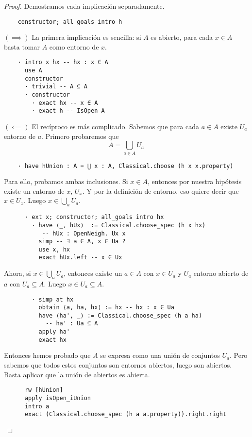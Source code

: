 \begin{proof}
  Demostramos cada implicación separadamente.

  \begin{lstlisting}
    constructor; all_goals intro h \end{lstlisting}

  $(\implies)$ La primera implicación es sencilla: si $A$ es abierto, para cada $x \in A$ basta tomar $A$ como entorno de $x$.

  \begin{lstlisting}
    · intro x hx -- hx : x ∈ A
      use A
      constructor
      · trivial -- A ⊆ A
      · constructor
        · exact hx -- x ∈ A
        · exact h -- IsOpen A \end{lstlisting}

  $(\impliedby)$ El recíproco es más complicado. Sabemos que para cada $a \in A$ existe $U_a$ entorno de $a$. Primero probaremos que
  $$
  A = \bigcup_{a \in A} U_a
  $$
  \begin{lstlisting}
    · have hUnion : A = ⋃ x : A, Classical.choose (h x x.property) \end{lstlisting}
  Para ello, probamos ambas inclusiones. Si $x \in A$, entonces por nuestra hipótesis existe un entorno de $x$, $U_x$. Y por la definición de entorno, eso quiere decir que $x \in U_x$. Luego $x \in \bigcup_{a}U_a$.

  \begin{lstlisting}
      · ext x; constructor; all_goals intro hx
        · have ⟨_, hUx⟩  := Classical.choose_spec (h x hx)
           -- hUx : OpenNeigh. Ux x
          simp -- ∃ a ∈ A, x ∈ Ua ?
          use x, hx
          exact hUx.left -- x ∈ Ux \end{lstlisting}

  Ahora, si $x \in \bigcup_{a}U_a$, entonces existe un $a \in A$ con $x \in U_a$ y $U_a$ entorno abierto de $a$ con $U_a \subseteq A$. Luego $x \in U_a \subseteq A$.

  \begin{lstlisting}
        · simp at hx
          obtain ⟨a, ha, hx⟩ := hx -- hx : x ∈ Ua
          have ⟨ha', _⟩ := Classical.choose_spec (h a ha)
            -- ha' : Ua ⊆ A
          apply ha'
          exact hx \end{lstlisting}
  
  Entonces hemos probado que $A$ se expresa como una unión de conjuntos $U_a$. Pero sabemos que todos estos conjuntos son entornos abiertos, luego son abiertos. Basta aplicar que la unión de abiertos es abierta.

  \begin{lstlisting}
      rw [hUnion]
      apply isOpen_iUnion
      intro a
      exact (Classical.choose_spec (h a a.property)).right.right \end{lstlisting}
\end{proof}

